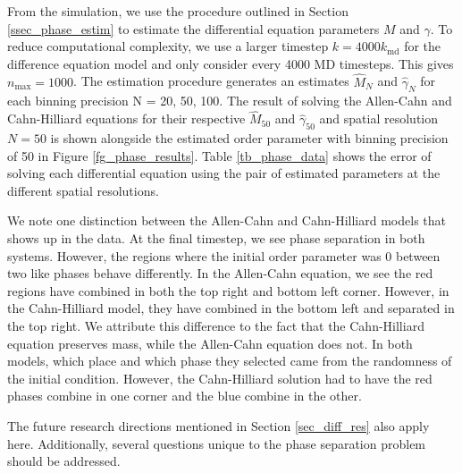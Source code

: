 \documentclass[12pt, reqno]{report}
\theoremstyle{definition}
\theoremstyle{remark}
\begin{document}
From the simulation, we use the procedure outlined in Section \ref{ssec_phase_estim} to estimate the differential equation parameters $M$ and $\gamma$.
To reduce computational complexity, we use a larger timestep $k=4000k_{\text{md}}$ for the difference equation model and only consider every 4000 MD timesteps. 
This gives $n_\text{max}=1000$. The estimation procedure generates an estimates $\hat M_N$ and $\hat \gamma_N$ for each binning precision N = 20, 50, 100. 
The result of solving the Allen-Cahn and Cahn-Hilliard equations for their respective $\hat M_{50}$ and $\hat \gamma_{50}$ and spatial resolution $N = 50$ is shown alongside the estimated order parameter with binning precision of 50 in Figure \ref{fg_phase_results}.
Table \ref{tb_phase_data} shows the error of solving each differential equation using the pair of estimated parameters at the different spatial resolutions.

We note one distinction between the Allen-Cahn and Cahn-Hilliard models that shows up in the data.
At the final timestep, we see phase separation in both systems.
However, the regions where the initial order parameter was 0 between two like phases behave differently.
In the Allen-Cahn equation, we see the red regions have combined in both the top right and bottom left corner.
However, in the Cahn-Hilliard model, they have combined in the bottom left and separated in the top right.
We attribute this difference to the fact that the Cahn-Hilliard equation preserves mass, while the Allen-Cahn equation does not.
In both models, which place and which phase they selected came from the randomness of the initial condition.
However, the Cahn-Hilliard solution had to have the red phases combine in one corner and the blue combine in the other.

The future research directions mentioned in Section \ref{sec_diff_res} also apply here. 
Additionally, several questions unique to the phase separation problem should be addressed.
\end{document}
